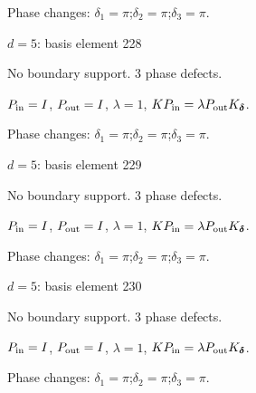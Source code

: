 \par\smallskip\begin{minipage}{.98\linewidth}\small Phase changes: $\delta_{1}=\pi$;\quad $\delta_{2}=\pi$;\quad $\delta_{3}=\pi$.\end{minipage}
\vfill
{\footnotesize\texttt{}}
\newpage
{}
{\Large $d=5$: basis element 228}\par
No boundary support. 3 phase defects.
\begin{center}
\end{center}
\vspace{-1mm}
$P_{\rm in}=I$, \quad $P_{\rm out}=I$, \quad $\lambda=1$, \qquad $K P_{\rm in}=\lambda P_{\rm out}K_{\boldsymbol\delta}$.
\par\smallskip\begin{minipage}{.98\linewidth}\small Phase changes: $\delta_{1}=\pi$;\quad $\delta_{2}=\pi$;\quad $\delta_{3}=\pi$.\end{minipage}
\vfill
{\footnotesize\texttt{}}
\newpage
{}
{\Large $d=5$: basis element 229}\par
No boundary support. 3 phase defects.
\begin{center}
\end{center}
\vspace{-1mm}
$P_{\rm in}=I$, \quad $P_{\rm out}=I$, \quad $\lambda=1$, \qquad $K P_{\rm in}=\lambda P_{\rm out}K_{\boldsymbol\delta}$.
\par\smallskip\begin{minipage}{.98\linewidth}\small Phase changes: $\delta_{1}=\pi$;\quad $\delta_{2}=\pi$;\quad $\delta_{3}=\pi$.\end{minipage}
\vfill
{\footnotesize\texttt{}}
\newpage
{}
{\Large $d=5$: basis element 230}\par
No boundary support. 3 phase defects.
\begin{center}
\end{center}
\vspace{-1mm}
$P_{\rm in}=I$, \quad $P_{\rm out}=I$, \quad $\lambda=1$, \qquad $K P_{\rm in}=\lambda P_{\rm out}K_{\boldsymbol\delta}$.
\par\smallskip\begin{minipage}{.98\linewidth}\small Phase changes: $\delta_{1}=\pi$;\quad $\delta_{2}=\pi$;\quad $\delta_{3}=\pi$.\end{minipage}
